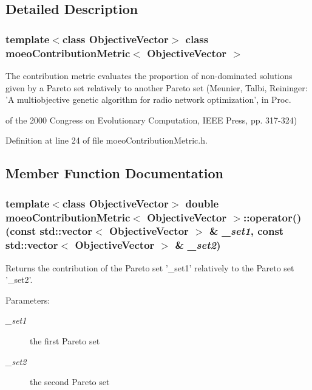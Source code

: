 \subsection{Detailed Description}
\subsubsection*{template$<$class Objective\-Vector$>$ class moeo\-Contribution\-Metric$<$ Objective\-Vector $>$}

The contribution metric evaluates the proportion of non-dominated solutions given by a Pareto set relatively to another Pareto set (Meunier, Talbi, Reininger: 'A multiobjective genetic algorithm for radio network optimization', in Proc. 

of the 2000 Congress on Evolutionary Computation, IEEE Press, pp. 317-324) 



Definition at line 24 of file moeo\-Contribution\-Metric.h.

\subsection{Member Function Documentation}
\subsubsection{\setlength{\rightskip}{0pt plus 5cm}template$<$class Objective\-Vector$>$ double \bf{moeo\-Contribution\-Metric}$<$ Objective\-Vector $>$::operator() (const std::vector$<$ Objective\-Vector $>$ \& {\em \_\-set1}, const std::vector$<$ Objective\-Vector $>$ \& {\em \_\-set2})\hspace{0.3cm}{\tt  [inline]}}\label{classmoeoContributionMetric_491610f6557874c2989eaa7a75117dcb}


Returns the contribution of the Pareto set '\_\-set1' relatively to the Pareto set '\_\-set2'. 

\begin{Desc}
\item[Parameters:]
\begin{description}
\item[{\em \_\-set1}]the first Pareto set \item[{\em \_\-set2}]the second Pareto set \end{description}
\end{Desc}


